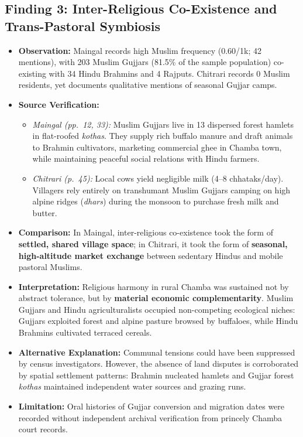 \documentclass[11pt,a4paper]{article}
\begin{document}
\subsection{Finding 3: Inter-Religious Co-Existence and Trans-Pastoral Symbiosis}
\begin{itemize}[leftmargin=*]
    \item \textbf{Observation:} Maingal records high Muslim frequency (0.60/1k; 42 mentions), with 203 Muslim Gujjars (81.5\% of the sample population) co-existing with 34 Hindu Brahmins and 4 Rajputs. Chitrari records 0 Muslim residents, yet documents qualitative mentions of seasonal Gujjar camps.
    \item \textbf{Source Verification:}
    \begin{itemize}
        \item \textit{Maingal (pp.~12, 33):} Muslim Gujjars live in 13 dispersed forest hamlets in flat-roofed \textit{kothas}. They supply rich buffalo manure and draft animals to Brahmin cultivators, marketing commercial ghee in Chamba town, while maintaining peaceful social relations with Hindu farmers.
        \item \textit{Chitrari (p.~45):} Local cows yield negligible milk (4--8 chhataks/day). Villagers rely entirely on transhumant Muslim Gujjars camping on high alpine ridges (\textit{dhars}) during the monsoon to purchase fresh milk and butter.
    \end{itemize}
    \item \textbf{Comparison:} In Maingal, inter-religious co-existence took the form of \textbf{settled, shared village space}; in Chitrari, it took the form of \textbf{seasonal, high-altitude market exchange} between sedentary Hindus and mobile pastoral Muslims.
    \item \textbf{Interpretation:} Religious harmony in rural Chamba was sustained not by abstract tolerance, but by \textbf{material economic complementarity}. Muslim Gujjars and Hindu agriculturalists occupied non-competing ecological niches: Gujjars exploited forest and alpine pasture browsed by buffaloes, while Hindu Brahmins cultivated terraced cereals.
    \item \textbf{Alternative Explanation:} Communal tensions could have been suppressed by census investigators. However, the absence of land disputes is corroborated by spatial settlement patterns: Brahmin nucleated hamlets and Gujjar forest \textit{kothas} maintained independent water sources and grazing runs.
    \item \textbf{Limitation:} Oral histories of Gujjar conversion and migration dates were recorded without independent archival verification from princely Chamba court records.
\end{itemize}
\end{document}
